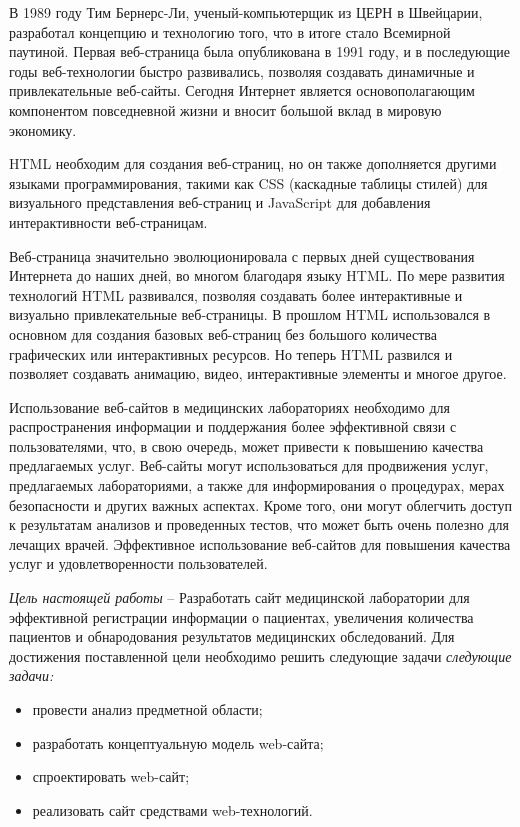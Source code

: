 \newsection
{}

В 1989 году Тим Бернерс-Ли, ученый-компьютерщик из ЦЕРН в Швейцарии, разработал концепцию и технологию того, что в итоге стало Всемирной паутиной. Первая веб-страница была опубликована в 1991 году, и в последующие годы веб-технологии быстро развивались, позволяя создавать динамичные и привлекательные веб-сайты. Сегодня Интернет является основополагающим компонентом повседневной жизни и вносит большой вклад в мировую экономику.

HTML необходим для создания веб-страниц, но он также дополняется другими языками программирования, такими как CSS (каскадные таблицы стилей) для визуального представления веб-страниц и JavaScript для добавления интерактивности веб-страницам.

Веб-страница значительно эволюционировала с первых дней существования Интернета до наших дней, во многом благодаря языку HTML. По мере развития технологий HTML развивался, позволяя создавать более интерактивные и визуально привлекательные веб-страницы. В прошлом HTML использовался в основном для создания базовых веб-страниц без большого количества графических или интерактивных ресурсов. Но теперь HTML развился и позволяет создавать анимацию, видео, интерактивные элементы и многое другое.

Использование веб-сайтов в медицинских лабораториях необходимо для распространения информации и поддержания более эффективной связи с пользователями, что, в свою очередь, может привести к повышению качества предлагаемых услуг. Веб-сайты могут использоваться для продвижения услуг, предлагаемых лабораториями, а также для информирования о процедурах, мерах безопасности и других важных аспектах. Кроме того, они могут облегчить доступ к результатам анализов и проведенных тестов, что может быть очень полезно для лечащих врачей. Эффективное использование веб-сайтов для повышения качества услуг и удовлетворенности пользователей.

\emph{Цель настоящей работы} – Разработать сайт медицинской лаборатории для эффективной регистрации информации о пациентах, увеличения количества пациентов и обнародования результатов медицинских обследований. Для достижения поставленной цели необходимо решить следующие задачи \emph{следующие задачи:}
\begin{itemize}
\item провести анализ предметной области;
\item разработать концептуальную модель web-сайта;
\item спроектировать web-сайт;
\item реализовать сайт средствами web-технологий.
\end{itemize}

